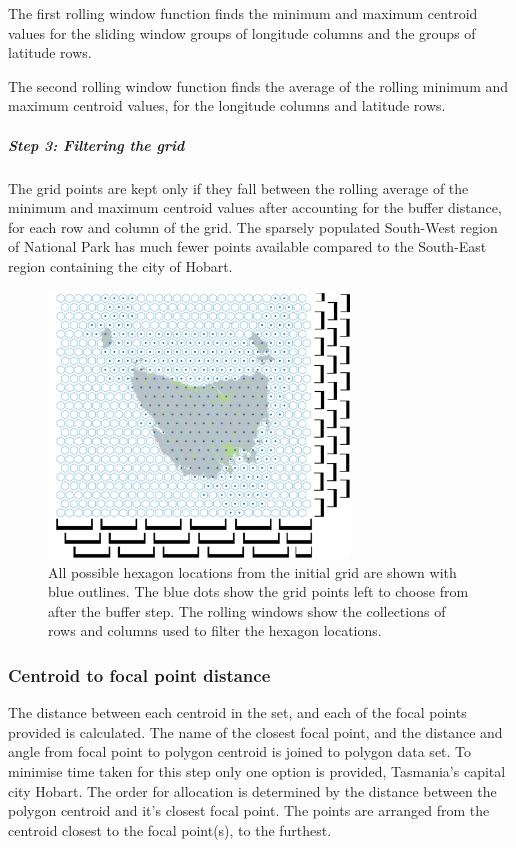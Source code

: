 \documentclass{monashthesis}
\begin{document}
The first rolling window function finds the minimum and maximum centroid values for the sliding window groups of longitude columns and the groups of latitude rows.

The second rolling window function finds the average of the rolling minimum and maximum centroid values, for the longitude columns and latitude rows.

\hypertarget{step-3-filtering-the-grid}{%
\subparagraph{Step 3: Filtering the grid}\label{step-3-filtering-the-grid}}

The grid points are kept only if they fall between the rolling average of the minimum and maximum centroid values after accounting for the buffer distance, for each row and column of the grid. The sparsely populated South-West region of National Park has much fewer points available compared to the South-East region containing the city of Hobart.

\begin{figure}[H]
\centering
\includegraphics[width=8cm]{figures/03-algorithm/3grid.png}
\caption{\label{fig:filter-grid}All possible hexagon locations from the initial grid are shown with blue outlines. The blue dots show the grid points left to choose from after the buffer step. The rolling windows show the collections of rows and columns used to filter the hexagon locations.}
\end{figure}

\hypertarget{centroid-to-focal-point-distance}{%
\subsubsection{Centroid to focal point distance}\label{centroid-to-focal-point-distance}}

The distance between each centroid in the set, and each of the focal points provided is calculated. The name of the closest focal point, and the distance and angle from focal point to polygon centroid is joined to polygon data set. To minimise time taken for this step only one option is provided, Tasmania's capital city Hobart.
The order for allocation is determined by the distance between the polygon centroid and it's closest focal point. The points are arranged from the centroid closest to the focal point(s), to the furthest.
\end{document}
